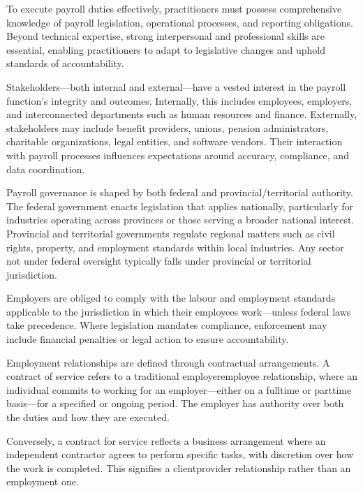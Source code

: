 \documentclass[letterpaper,10pt,english]{sphinxmanual}
\begin{document}
\sphinxAtStartPar
To execute payroll duties effectively, practitioners must possess comprehensive knowledge of payroll legislation, operational
processes, and reporting obligations. Beyond technical expertise, strong interpersonal and professional skills are essential,
enabling practitioners to adapt to legislative changes and uphold standards of accountability.

\sphinxAtStartPar
Stakeholders—both internal and external—have a vested interest in the payroll function’s integrity and outcomes. Internally,
this includes employees, employers, and interconnected departments such as human resources and finance. Externally,
stakeholders may include benefit providers, unions, pension administrators, charitable organizations, legal entities, and
software vendors. Their interaction with payroll processes influences expectations around accuracy, compliance, and data
coordination.

\sphinxAtStartPar
Payroll governance is shaped by both federal and provincial/territorial authority. The federal government enacts legislation
that applies nationally, particularly for industries operating across provinces or those serving a broader national interest.
Provincial and territorial governments regulate regional matters such as civil rights, property, and employment standards
within local industries. Any sector not under federal oversight typically falls under provincial or territorial jurisdiction.

\sphinxAtStartPar
Employers are obliged to comply with the labour and employment standards applicable to the jurisdiction in which their
employees work—unless federal laws take precedence. Where legislation mandates compliance, enforcement may include financial
penalties or legal action to ensure accountability.

\sphinxAtStartPar
Employment relationships are defined through contractual arrangements. A contract of service refers to a traditional
employer\sphinxhyphen{}employee relationship, where an individual commits to working for an employer—either on a full\sphinxhyphen{}time or part\sphinxhyphen{}time
basis—for a specified or ongoing period. The employer has authority over both the duties and how they are executed.

\sphinxAtStartPar
Conversely, a contract for service reflects a business arrangement where an independent contractor agrees to perform specific
tasks, with discretion over how the work is completed. This signifies a client\sphinxhyphen{}provider relationship rather than an employment
one.
\end{document}
